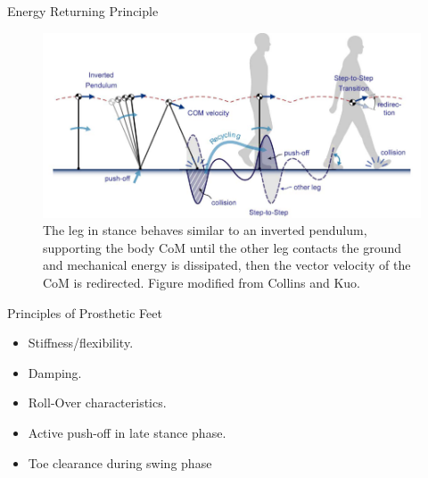 \documentclass[10pt]{beamer}
\begin{document}
\begin{frame}{Energy Returning Principle}

\begin{figure}
\begin{centering}
\includegraphics[scale=0.30]{Feathergraphics/RecycledEng}
\par\end{centering}

{\footnotesize \caption{\label{fig:Representaci} The leg in stance behaves similar to an inverted pendulum, supporting the body CoM until the other leg contacts the ground and mechanical energy is dissipated, then the vector velocity of the CoM is redirected. Figure modified from Collins and Kuo\cite{Collins2010}.}}

\end{figure}

\end{frame}



\begin{frame}{Principles of Prosthetic Feet}
\begin{alertblock}{}

\begin{itemize}
\item {Stiffness/flexibility.}
\item {Damping.}
\item {Roll-Over characteristics.}
\item {Active push-off in late stance phase.}
\item {Toe clearance during swing phase}
\end{itemize}
\end{alertblock}
\end{frame}
\end{document}

